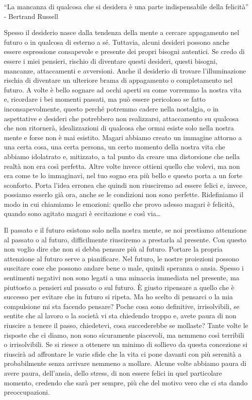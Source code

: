 \documentclass[12pt]{book} %
\begin{document}
“La mancanza di qualcosa che si desidera è una parte indispensabile della felicità” - Bertrand Russell

Spesso il desiderio nasce dalla tendenza della mente a cercare appagamento nel futuro o in qualcosa di esterno a sé. Tuttavia, alcuni desideri possono anche essere espressione consapevole e presente dei propri bisogni autentici. Se
credo di essere i miei pensieri, rischio di diventare questi desideri, questi bisogni, mancanze, attaccamenti e avversioni. Anche il
desiderio di trovare l'illuminazione rischia di diventare un ulteriore brama di appagamento o completamento nel
futuro. A volte è bello sognare ad occhi aperti su come vorremmo la nostra vita e, ricordare i bei momenti passati, ma può essere
pericoloso se fatto inconsapevolmente, questo perché potremmo cadere nella nostalgia, o in aspettative e desideri che potrebbero non realizzarsi, attaccamento su qualcosa che non ritornerà, idealizzazioni di qualcosa che ormai esiste solo nella nostra mente e forse non è mai esistito. Magari abbiamo creato un immagine attorno a una certa cosa, una certa persona, un certo momento della nostra
vita che abbiamo idolatrato e, mitizzato, a tal punto da creare una distorsione che nella realtà non era così perfetta.
Altre volte invece ottieni quello che volevi, ma non era come te lo immaginavi, nel tuo sogno era più bello e questo
porta a un forte sconforto. Porta l'idea erronea che quindi non riusciremo ad essere felici e, invece, possiamo esserlo già ora, anche se le condizioni non sono perfette. Ridefiniamo il modo in cui chiamiamo le emozioni:
quello che provo adesso magari è felicità, quando sono agitato magari è eccitazione e così via…

Il passato e il futuro
esistono solo nella nostra mente, se noi prestiamo attenzione al passato o al futuro, difficilmente riusciremo a prestarla al presente. Con questo non voglio dire che non si debba pensare più al futuro. Portare la propria attenzione al futuro serve a pianificare. Nel futuro, le nostre proiezioni possono suscitare cose che possono andare bene o male, quindi speranza o ansia. Spesso i sentimenti negativi non sono legati a una minaccia immediata nel presente, ma piuttosto a pensieri sul passato o sul futuro. È giusto ripensare a quello che è successo per evitare che in futuro si ripeta. Ma ho scelto di pensarci o la mia compulsione mi sta facendo pensare?
Poche cosa sono definitive, irrisolvibili, se sentite che al lavoro o la società
vi sta chiedendo troppo e, avete paura di non riuscire a tenere il passo, chiedetevi, cosa succederebbe se mollaste?
Tante volte le risposte che ci diamo, non sono sicuramente piacevoli, ma nemmeno così terribili o irrisolvibili. Se si riesce a ottenere un minimo di sollievo da questa concezione si
riuscirà ad affrontare le varie sfide che la vita ci pone davanti con più serenità a probabilmente senza arrivare
nemmeno a mollare. Alcune volte abbiamo paura di avere paura, dell'ansia, dello stress, di non
essere felici in quel particolare momento, credendo che sarà per sempre, più che del motivo vero che ci sta dando
preoccupazioni.
\end{document}

